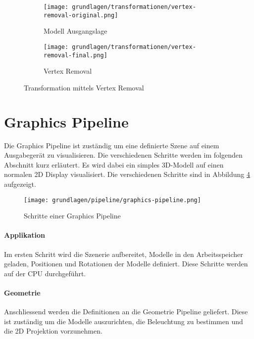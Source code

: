 \begin{figure}[H]
  \centering
  \begin{subfigure}{.5\textwidth}
    \centering
    \texttt{[image: grundlagen/transformationen/vertex-removal-original.png]}
    \caption{Modell Ausgangslage}
    \label{fig:transformationVertexRemovalOriginal}
  \end{subfigure}%
  \begin{subfigure}{.5\textwidth}
    \centering
    \texttt{[image: grundlagen/transformationen/vertex-removal-final.png]}
    \caption{Vertex Removal}
    \label{fig:transformationVertexRemovalFinal}
  \end{subfigure}
  \caption{Transformation mittels Vertex Removal}
  \label{fig:transformationVertexRemoval}
\end{figure}

\section{Graphics Pipeline}
Die Graphics Pipeline ist zuständig um eine definierte Szene auf einem Ausgabegerät zu visualisieren. Die verschiedenen Schritte werden im folgenden Abschnitt kurz erläutert. Es wird dabei ein simples 3D-Modell auf einen normalen 2D Display visualisiert. Die verschiedenen Schritte sind in Abbildung \ref{fig:renderingPipelineOverview} aufgezeigt.

\begin{figure}[H]
  \centering
  \texttt{[image: grundlagen/pipeline/graphics-pipeline.png]}
  \caption{Schritte einer Graphics Pipeline}
  \label{fig:renderingPipelineOverview}
\end{figure}

\paragraph{Applikation}
Im ersten Schritt wird die Szenerie aufbereitet, Modelle in den Arbeitsspeicher geladen, Positionen und Rotationen der Modelle definiert. Diese Schritte werden auf der CPU durchgeführt.

\paragraph{Geometrie}
Anschliessend werden die Definitionen an die Geometrie Pipeline geliefert. Diese ist zuständig um die Modelle auszurichten, die Beleuchtung zu bestimmen und die 2D Projektion vorzunehmen.

